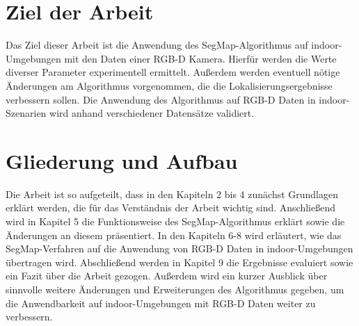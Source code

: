 \section[Ziel der Arbeit (Schmelzer)]{Ziel der Arbeit}

Das Ziel dieser Arbeit ist die Anwendung des SegMap-Algorithmus auf indoor-Um\-ge\-bung\-en mit den Daten einer RGB-D Kamera. Hierfür werden die Werte diverser Parameter experimentell ermittelt. Außerdem werden eventuell nötige Änderungen am Algorithmus vorgenommen, die die Lokalisierungsergebnisse verbessern sollen. Die Anwendung des Algorithmus auf RGB-D Daten in indoor-Szenarien wird anhand verschiedener Datensätze validiert. 





\section[Gliederung und Aufbau (Schmelzer)]{Gliederung und Aufbau}

Die Arbeit ist so aufgeteilt, dass in den Kapiteln 2 bis 4 zunächst Grundlagen erklärt werden, die für das Verständnis der Arbeit wichtig sind. Anschließend wird in Kapitel 5 die Funktionsweise des SegMap-Algorithmus erklärt sowie die Änderungen an diesem präsentiert. In den Kapiteln 6-8 wird erläutert, wie das SegMap-Verfahren auf die Anwendung von RGB-D Daten in indoor-Umgebungen übertragen wird. Abschließend werden in Kapitel 9 die Ergebnisse evaluiert sowie ein Fazit über die Arbeit gezogen. Außerdem wird ein kurzer Ausblick über sinnvolle weitere Änderungen und Erweiterungen des Algorithmus gegeben, um die Anwendbarkeit auf indoor-Umgebungen mit RGB-D Daten weiter zu verbessern.


